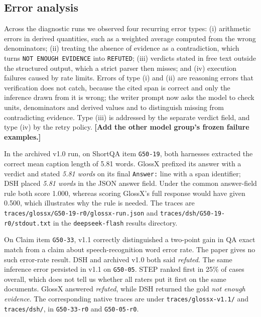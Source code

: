 \documentclass{article}
\newcommand{\sysname}{GlossX}
\newcommand{\ds}[1]{\textsf{#1}}
\newcommand{\TBD}[1]{\textcolor{glred}{\textbf{[#1]}}}
\newcommand{\code}[1]{\texttt{\small #1}}
\begin{document}
\subsection{Error analysis}
\label{sec:errors}
Across the diagnostic runs we observed four recurring error types: (i) arithmetic errors in derived quantities, such as a weighted average computed from the wrong denominators; (ii) treating the absence of evidence as a contradiction, which turns \code{NOT ENOUGH EVIDENCE} into \code{REFUTED}; (iii) verdicts stated in free text outside the structured output, which a strict parser then misses; and (iv) execution failures caused by rate limits. Errors of type (i) and (ii) are reasoning errors that verification does not catch, because the cited span is correct and only the inference drawn from it is wrong; the writer prompt now asks the model to check units, denominators and derived values and to distinguish missing from contradicting evidence. Type (iii) is addressed by the separate verdict field, and type (iv) by the retry policy. \TBD{Add the other model group's frozen failure examples.}

In the archived v1.0 run, on \ds{ShortQA} item \code{G50-19}, both harnesses extracted the correct mean caption length of 5.81 words. \sysname{} prefixed its answer with a verdict and stated \emph{5.81 words} on its final \code{Answer:} line with a span identifier; DSH placed \emph{5.81 words} in the JSON answer field. Under the common answer-field rule both score 1.000, whereas scoring \sysname{}'s full response would have given 0.500, which illustrates why the rule is needed. The traces are \nolinkurl{traces/glossx/G50-19-r0/glossx-run.json} and \nolinkurl{traces/dsh/G50-19-r0/stdout.txt} in the \code{deepseek-flash} results directory.

On \ds{Claim} item \code{G50-33}, v1.1 correctly distinguished a two-point gain in QA exact match from a claim about speech-recognition word error rate. The paper gives no such error-rate result. DSH and archived v1.0 both said \emph{refuted}. The same inference error persisted in v1.1 on \code{G50-05}. STEP ranked first in 25\% of cases overall, which does not tell us whether all raters put it first on the same documents. GlossX answered \emph{refuted}, while DSH returned the gold \emph{not enough evidence}. The corresponding native traces are under \nolinkurl{traces/glossx-v1.1/} and \nolinkurl{traces/dsh/}, in \code{G50-33-r0} and \code{G50-05-r0}.

\end{document}
